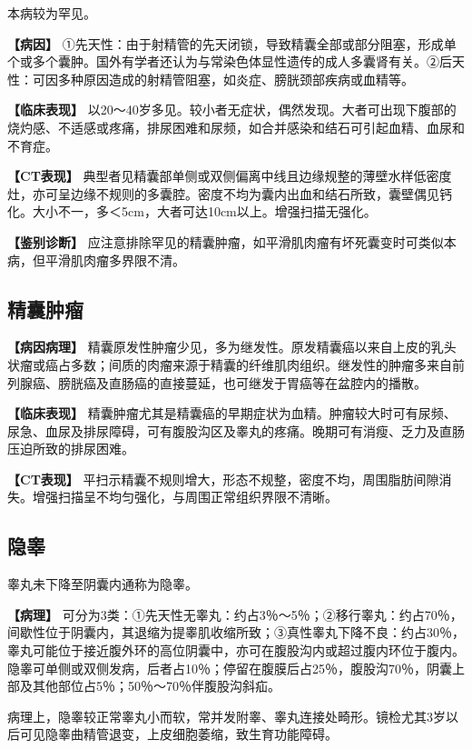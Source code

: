 本病较为罕见。

\textbf{【病因】}
①先天性：由于射精管的先天闭锁，导致精囊全部或部分阻塞，形成单个或多个囊肿。国外有学者还认为与常染色体显性遗传的成人多囊肾有关。②后天性：可因多种原因造成的射精管阻塞，如炎症、膀胱颈部疾病或血精等。

\textbf{【临床表现】}
以20～40岁多见。较小者无症状，偶然发现。大者可出现下腹部的烧灼感、不适感或疼痛，排尿困难和尿频，如合并感染和结石可引起血精、血尿和不育症。

\textbf{【CT表现】}
典型者见精囊部单侧或双侧偏离中线且边缘规整的薄壁水样低密度灶，亦可呈边缘不规则的多囊腔。密度不均为囊内出血和结石所致，囊壁偶见钙化。大小不一，多＜5cm，大者可达10cm以上。增强扫描无强化。

\textbf{【鉴别诊断】}
应注意排除罕见的精囊肿瘤，如平滑肌肉瘤有坏死囊变时可类似本病，但平滑肌肉瘤多界限不清。

\subsection{精囊肿瘤}

\textbf{【病因病理】}
精囊原发性肿瘤少见，多为继发性。原发精囊癌以来自上皮的乳头状瘤或癌占多数；间质的肉瘤来源于精囊的纤维肌肉组织。继发性的肿瘤多来自前列腺癌、膀胱癌及直肠癌的直接蔓延，也可继发于胃癌等在盆腔内的播散。

\textbf{【临床表现】}
精囊肿瘤尤其是精囊癌的早期症状为血精。肿瘤较大时可有尿频、尿急、血尿及排尿障碍，可有腹股沟区及睾丸的疼痛。晚期可有消瘦、乏力及直肠压迫所致的排尿困难。

\textbf{【CT表现】}
平扫示精囊不规则增大，形态不规整，密度不均，周围脂肪间隙消失。增强扫描呈不均匀强化，与周围正常组织界限不清晰。

\subsection{隐睾}

睾丸未下降至阴囊内通称为隐睾。

\textbf{【病理】}
可分为3类：①先天性无睾丸：约占3％～5％；②移行睾丸：约占70％，间歇性位于阴囊内，其退缩为提睾肌收缩所致；③真性睾丸下降不良：约占30％，睾丸可能位于接近腹外环的高位阴囊中，亦可在腹股沟内或超过腹内环位于腹内。隐睾可单侧或双侧发病，后者占10％；停留在腹膜后占25％，腹股沟70％，阴囊上部及其他部位占5％；50％～70％伴腹股沟斜疝。

病理上，隐睾较正常睾丸小而软，常并发附睾、睾丸连接处畸形。镜检尤其3岁以后可见隐睾曲精管退变，上皮细胞萎缩，致生育功能障碍。

